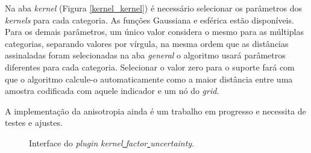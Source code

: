 Na aba \textit{kernel} (Figura \autoref{kernel_kernel}) é necessário selecionar os parâmetros dos \textit{kernels} para cada categoria. As funções Gaussiana e esférica estão disponíveis. Para os demais parâmetros, um único valor considera o mesmo para as múltiplas categorias, separando valores por vírgula, na mesma ordem que as distâncias assinaladas foram selecionadas na aba \textit{general} o algoritmo usará parâmetros diferentes para cada categoria. Selecionar o valor zero para o suporte fará com que o algoritmo calcule-o automaticamente como a maior distância entre uma amostra codificada com aquele indicador e um nó do \textit{grid}.

A implementação da anisotropia ainda é um trabalho em progresso e necessita de testes e ajustes.

\begin{figure}[H] 
    \centering
    \caption{Interface do \textit{plugin} \textit{kernel\underline{ }factor\underline{ }uncertainty}.} \label{kernel_plug}
     \hspace{1em}
\end{figure}

